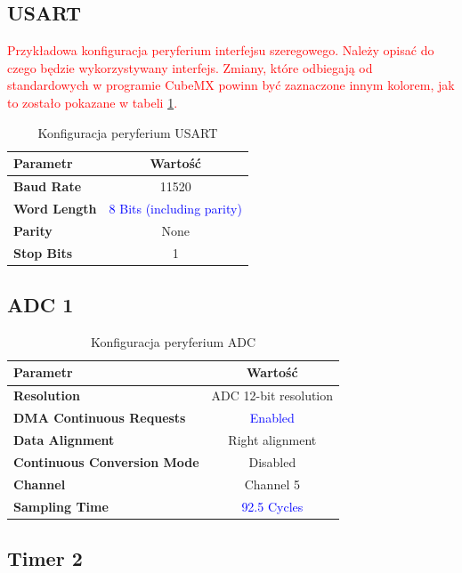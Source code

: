 \documentclass[10pt, a4paper]{article}
\begin{document}
\subsection{USART}
\textcolor{red}{Przykładowa konfiguracja peryferium interfejsu szeregowego.
	Należy opisać do czego będzie wykorzystywany interfejs. 
	Zmiany, które odbiegają od standardowych w programie CubeMX 
	powinn być zaznaczone innym kolorem, jak to zostało pokazane 
	w tabeli \ref{tab:USART}.}

\begin{table}[H]
	\centering
	\begin{tabular}{|l|c|} \hline
		\textbf{Parametr} & Wartość \\
		\hline
		\hline  \textbf{Baud Rate}&11520  \\\hline
		\textbf{Word Length } & \textcolor{blue}{8 Bits (including parity)}\\\hline
		\textbf{Parity} &  None\\
		\hline
		\textbf{Stop Bits}& 1\\
		\hline
	\end{tabular}
	\caption{Konfiguracja peryferium USART}
	\label{tab:USART}
\end{table}

\subsection{ADC 1}

\begin{table}[H]
	\centering
	\begin{tabular}{|l|c|} \hline
		\textbf{Parametr} & Wartość \\
		\hline
		\hline  \textbf{Resolution}&ADC 12-bit resolution  \\\hline
		\textbf{DMA Continuous Requests} & \textcolor{blue}{Enabled}\\\hline
		\textbf{Data Alignment} &  Right alignment\\
		\hline
		\textbf{Continuous Conversion Mode}& Disabled\\
		\hline
		\textbf{Channel}& Channel 5\\
		\hline
		\textbf{Sampling Time}& \textcolor{blue}{92.5 Cycles}\\
		\hline
	\end{tabular}
	\caption{Konfiguracja peryferium ADC}
	\label{tab:ADC}
\end{table}

\subsection{Timer 2}
\end{document}
